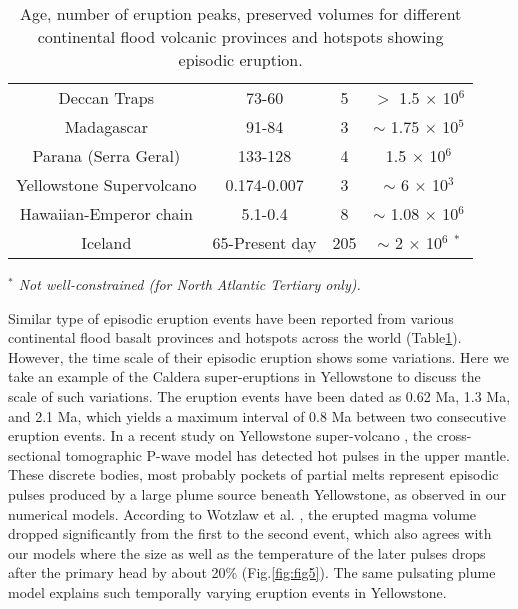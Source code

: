 \documentclass[12pt]{article}
\begin{document}
{\begin{table}[htb!]
\begin{center}
\begin{tabular}{|c   c   c   c |}
Deccan Traps   & 73-60  &  5  & $>$ 1.5 $\times$ 10$^{6}$  \cite{pande2002age}  \\

 Madagascar  &  91-84  &  3   &  $\sim$ 1.75 $\times$ 10$^{5}$  \cite{courtillot2003ages}  \\

 Parana (Serra Geral)  &  133-128  &  4   &  1.5 $\times$ 10$^{6}$  \cite{richards1989flood}  \\

Yellowstone Supervolcano  &  0.174-0.007  &  3   &  $\sim$ 6 $\times$ 10$^{3}$  \cite{girard2012future}  \\

Hawaiian-Emperor chain  &  5.1-0.4  &  8   &  $\sim$ 1.08 $\times$ 10$^{6}$  \cite{bargar1974calculated}  \\

Iceland  &  65-Present day  &  205 \cite{thordarson2007volcanism}    &   $\sim$ 2 $\times$ 10$^{6}$  \cite{richards1989flood} $^*$   \\

\hline
\end{tabular}
\textit{$^*$ \small Not well-constrained (for North Atlantic Tertiary only).}
  \caption{\small \label{tab2} Age, number of eruption peaks, preserved volumes for different continental flood volcanic provinces and hotspots showing episodic eruption.
}
\end{center}
\end{table}




Similar type of episodic eruption events have been reported from various continental flood basalt provinces and hotspots across the world \cite{tolan1989revisions, pande2002age, courtillot2003ages, richards1989flood, girard2012future,  bargar1974calculated,  thordarson2007volcanism, hildenbrand2008multi} (Table\ref{tab2}). However, the time scale of their episodic eruption shows some variations. Here we take an example of the Caldera super-eruptions in Yellowstone to discuss the scale of such variations. The eruption events have been dated as 0.62 Ma, 1.3 Ma, and 2.1 Ma, which yields a maximum interval of 0.8 Ma between two consecutive eruption events. In a recent study on Yellowstone super-volcano \cite{huang2015yellowstone}, the cross-sectional tomographic P-wave model has detected hot pulses in the upper mantle. These discrete bodies, most probably pockets of partial melts represent episodic pulses produced by a large plume source beneath Yellowstone, as observed in our numerical models. According to Wotzlaw et al. \cite{wotzlaw2015rapid}, the erupted magma volume dropped 
significantly from the first to the second event, which also agrees with our models where the size as well as the temperature of the later pulses drops after the primary head by about 20\% (Fig.\ref{fig:fig5}). The same pulsating plume model explains such temporally varying eruption events in Yellowstone. 


}
\end{document}
